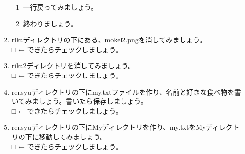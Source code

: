 \begin{tcolorbox}[title=\useOmetoi]
\begin{enumerate}
\begin{enumerate}
	\item 一行戻ってみましょう。
	\item 終わりましょう。
	\end{enumerate}
\item rikaディレクトリの下にある、mokei2.pngを消してみましょう。\\
□ ← できたらチェックしましょう。
\item rika2ディレクトリを消してみましょう。\\
□ ← できたらチェックしましょう。
\item rensyuディレクトリの下にmy.txtファイルを作り、名前と好きな食べ物を書いてみましょう。書いたら保存しましょう。\\
□ ← できたらチェックしましょう。
\item rensyuディレクトリの下にMyディレクトリを作り、my.txtをMyディレクトリの下に移動してみましょう。\\
□ ← できたらチェックしましょう。
\end{enumerate}
\end{tcolorbox}